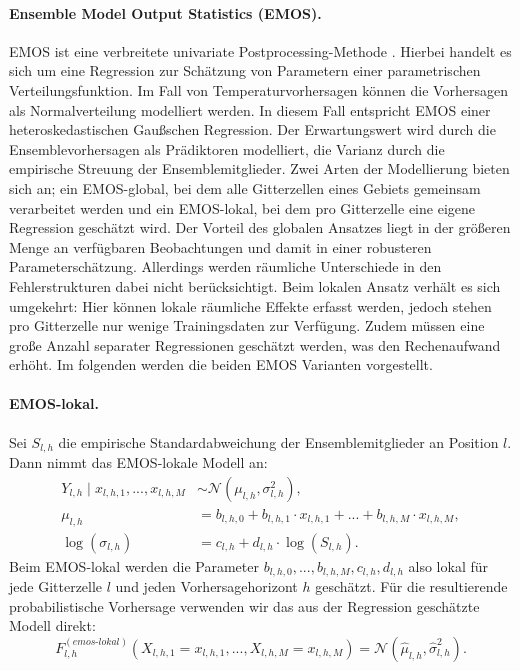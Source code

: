 \documentclass{article}
\numberwithin{equation}{section}
\begin{document}
\paragraph{Ensemble Model Output Statistics (EMOS).} EMOS ist eine verbreitete univariate \newline \noindent Postprocessing-Methode \parencite{gneiting_calibrated_2005,gebetsberger2018estimation}. Hierbei handelt es sich um eine Regression zur Schätzung von Parametern einer parametrischen Verteilungsfunktion. Im Fall von Temperaturvorhersagen können die Vorhersagen als Normalverteilung modelliert werden. In diesem Fall entspricht EMOS einer heteroskedastischen Gaußschen Regression. Der Erwartungswert wird durch die Ensemblevorhersagen als Prädiktoren modelliert, die Varianz durch die empirische Streuung der Ensemblemitglieder. Zwei Arten der Modellierung bieten sich an; ein EMOS-global, bei dem alle Gitterzellen eines Gebiets gemeinsam verarbeitet werden und ein EMOS-lokal, bei dem pro Gitterzelle eine eigene Regression geschätzt wird. Der Vorteil des globalen Ansatzes liegt in der größeren Menge an verfügbaren Beobachtungen und damit in einer robusteren Parameterschätzung. Allerdings werden räumliche Unterschiede in den Fehlerstrukturen dabei nicht berücksichtigt. Beim lokalen Ansatz verhält es sich umgekehrt: Hier können lokale räumliche Effekte erfasst werden, jedoch stehen pro Gitterzelle nur wenige Trainingsdaten zur Verfügung. Zudem müssen eine große Anzahl separater Regressionen geschätzt werden, was den Rechenaufwand erhöht. Im folgenden werden die beiden EMOS Varianten vorgestellt.

\paragraph{EMOS-lokal.}
Sei $S_{l,h}$ die empirische Standardabweichung der Ensemblemitglieder an Position $l$. Dann nimmt das EMOS-lokale Modell an:
\begin{equation}\label{eq:EMOS-local}
\begin{split}
Y_{l,h} \mid x_{l,h,1}, ..., x_{l,h,M} &\sim \mathcal{N}(\mu_{l,h}, \sigma_{l,h}^2),\\
\mu_{l,h} &= b_{l,h,0} + b_{l,h,1} \cdot x_{l,h,1} + ... + b_{l,h,M}\cdot x_{l,h,M},\\
\log(\sigma_{l,h}) &= c_{l,h} + d_{l,h} \cdot \log(S_{l,h}).
\end{split}
\end{equation}
Beim EMOS-lokal werden die Parameter $b_{l,h,0},...,b_{l,h,M}, c_{l,h}, d_{l,h}$ also lokal für jede Gitterzelle $l$ und jeden Vorhersagehorizont $h$ geschätzt. Für die resultierende probabilistische Vorhersage verwenden wir das aus der Regression geschätzte Modell direkt:
\[
F_{l,h}^{(emos\text{-}lokal)}(X_{l,h,1}=x_{l,h,1},...,X_{l,h,M}=x_{l,h,M}) = \mathcal{N}(\hat{\mu}_{l,h}, \hat{\sigma}_{l,h}^2).
\]
\end{document}

